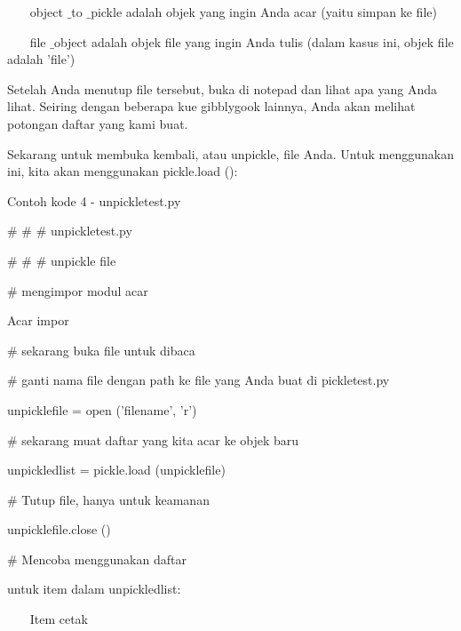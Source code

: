\vspace{12pt}
\noindent 
~~~ object $  \_  $to $  \_  $pickle adalah objek yang ingin Anda acar (yaitu simpan ke file) \par
\noindent 
~~~ file $  \_  $object adalah objek file yang ingin Anda tulis (dalam kasus ini, objek file adalah 'file') \par
\vspace{12pt}
\noindent 
Setelah Anda menutup file tersebut, buka di notepad dan lihat apa yang Anda lihat. Seiring dengan beberapa kue gibblygook lainnya, Anda akan melihat potongan daftar yang kami buat. \par
\vspace{12pt}
\noindent 
Sekarang untuk membuka kembali, atau unpickle, file Anda. Untuk menggunakan ini, kita akan menggunakan pickle.load (): \par
Contoh kode 4 - unpickletest.py \par
\vspace{12pt}
\noindent 
$  \#  $ $  \#  $ $  \#  $ unpickletest.py \par
\noindent 
$  \#  $ $  \#  $ $  \#  $ unpickle file \par
\vspace{12pt}
\noindent 
$  \#  $ mengimpor modul acar \par
\noindent 
Acar impor \par
\vspace{12pt}
\noindent 
$  \#  $ sekarang buka file untuk dibaca \par
\noindent 
$  \#  $ ganti nama file dengan path ke file yang Anda buat di pickletest.py \par
\noindent 
unpicklefile = open ('filename', 'r') \par
\vspace{12pt}
\noindent 
$  \#  $ sekarang muat daftar yang kita acar ke objek baru \par
\noindent 
unpickledlist = pickle.load (unpicklefile) \par
\vspace{12pt}
\noindent 
$  \#  $ Tutup file, hanya untuk keamanan \par
\noindent 
unpicklefile.close () \par
\vspace{12pt}
\noindent 
$  \#  $ Mencoba menggunakan daftar \par
\noindent 
untuk item dalam unpickledlist: \par
\noindent 
~~~ Item cetak \par
\vspace{12pt}

